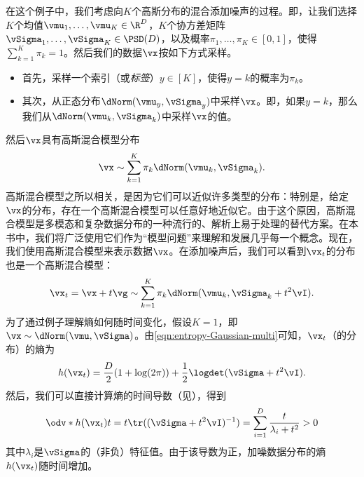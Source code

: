 \documentclass[../../book-main_zh.tex]{subfiles}
\begin{document}
\begin{example}[向高斯混合添加噪声]\label{ex:gaussian_mixture}
    在这个例子中，我们考虑向\(K\)个高斯分布的混合添加噪声的过程。即，让我们选择\(K\)个均值\(\vmu_{1}, \dots, \vmu_{K} \in \R^{D}\)，\(K\)个协方差矩阵\(\vSigma_{1}, \dots, \vSigma_{K} \in \PSD(D)\)，以及概率\(\pi_{1}, \dots, \pi_{K} \in [0, 1]\)，使得\(\sum_{k = 1}^{K}\pi_{k} = 1\)。然后我们的数据\(\vx\)按如下方式采样。
    \begin{itemize}
        \item 首先，采样一个索引（或\textit{标签}）\(y \in [K]\)，使得\(y = k\)的概率为\(\pi_{k}\)。
        \item 其次，从正态分布\(\dNorm(\vmu_{y}, \vSigma_{y})\)中采样\(\vx\)。即，如果\(y = k\)，那么我们从\(\dNorm(\vmu_{k}, \vSigma_{k})\)中采样\(\vx\)的值。
    \end{itemize}
    然后\(\vx\)具有高斯混合模型分布
    \begin{equation}
        \vx \sim \sum_{k = 1}^{K}\pi_{k}\dNorm(\vmu_{k}, \vSigma_{k}).
    \end{equation}
    高斯混合模型之所以相关，是因为它们可以近似许多类型的分布：特别是，给定\(\vx\)的分布，存在一个高斯混合模型可以任意好地近似它。由于这个原因，高斯混合模型是多模态和复杂数据分布的一种流行的、解析上易于处理的替代方案。在本书中，我们将广泛使用它们作为“模型问题”来理解和发展几乎每一个概念。现在，我们使用高斯混合模型来表示数据\(\vx\)。在添加噪声后，我们可以看到\(\vx_{t}\)的分布也是一个高斯混合模型：
    \begin{equation}
        \vx_{t} = \vx + t\vg \sim \sum_{k =
        1}^{K}\pi_{k}\dNorm(\vmu_{k}, \vSigma_{k} + t^{2}\vI).
    \end{equation}
    为了通过例子理解熵如何随时间变化，假设\(K=1\)，即\(\vx \sim \dNorm(\vmu, \vSigma)\)。由\eqref{eqn:entropy-Gaussian-multi}可知，\(\vx_{t}\)（的分布）的熵为
    \begin{equation}
        h(\vx_{t}) = \frac{D}{2}(1 + \log(2\pi)) +
        \frac{1}{2}\logdet(\vSigma + t^{2}\vI).
    \end{equation}
    然后，我们可以直接计算熵的时间导数（见），得到
    \begin{equation}
        \odv*{h(\vx_{t})}{t} = t\tr((\vSigma + t^{2}\vI)^{-1}) =
        \sum_{i = 1}^{D}\frac{t}{\lambda_{i} + t^{2}} > 0
    \end{equation}
    其中\(\lambda_{i}\)是\(\vSigma\)的（非负）特征值。由于该导数为正，加噪数据分布的熵\(h(\vx_{t})\)随时间增加。
\end{example}
\end{document}
